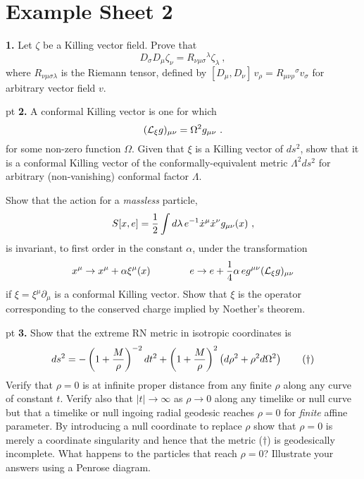 \vfill\eject

\section{Example Sheet 2}

\noindent
{\bf 1.} Let $\zeta$ be a Killing vector field. Prove that
$$
D_\sigma D_\mu \zeta_\nu = R_{\nu\mu\sigma}{}^\lambda \zeta_\lambda\ ,
$$
where $R_{\nu\mu\sigma\lambda}$ is the Riemann tensor, defined by
$[D_\mu,D_\nu]\, v_\rho = R_{\mu\nu\rho}{}^\sigma v_\sigma$ for
arbitrary vector field $v$.

 pt
\noindent
{\bf 2.}  A conformal Killing vector is one for which  
$$
({\cal L}_\xi g)_{\mu\nu} = \Omega^2 g_{\mu\nu}\ .
$$
for some non-zero function $\Omega$.
Given that $\xi$ is a Killing vector of $ds^2$, show that it is a
conformal Killing vector of the conformally-equivalent
metric $\Lambda^2 ds^2$ for arbitrary (non-vanishing) conformal factor
$\Lambda$.
 
Show that the action for a {\it massless} particle,
$$ S[x,e]={1\over2}\int d\lambda\, e^{-1}\dot x^\mu\dot x^\nu
g_{\mu\nu}(x)\ , $$ is invariant, to first order in the constant
$\alpha$, under the transformation 
$$
x^\mu \rightarrow x^\mu + \alpha \xi^\mu(x) \qquad \qquad
e \rightarrow e + {1\over4}\alpha\, e g^{\mu\nu}({\cal L}_\xi
g)_{\mu\nu}
$$
if $\xi =\xi^\mu \partial_\mu$ is a conformal Killing vector. Show
that $\xi$ is the operator corresponding to the conserved charge
implied by Noether's theorem.



 pt
\noindent
{\bf 3.} Show that the extreme RN metric in isotropic coordinates is
$$
ds^2 = -\left(1+{M\over\rho}\right)^{-2}dt^2 + 
\left(1+{M\over\rho}\right)^{2}\left(d\rho^2 + \rho^2 d\Omega^2\right)
\qquad (\dagger)
$$
Verify that $\rho=0$ is at infinite proper distance from any finite
$\rho$ along any curve of constant $t$. Verify also that
$|t|\rightarrow \infty$ as $\rho\rightarrow 0$ along any timelike or
null curve but that a timelike or null ingoing radial geodesic reaches
$\rho=0$ for {\it finite} affine parameter. By introducing a null
coordinate to replace $\rho$ show that $\rho=0$ is merely a coordinate
singularity and hence that the metric ($\dagger$) is geodesically
incomplete. What happens to the particles that reach $\rho=0$?
Illustrate your answers using a Penrose diagram.

